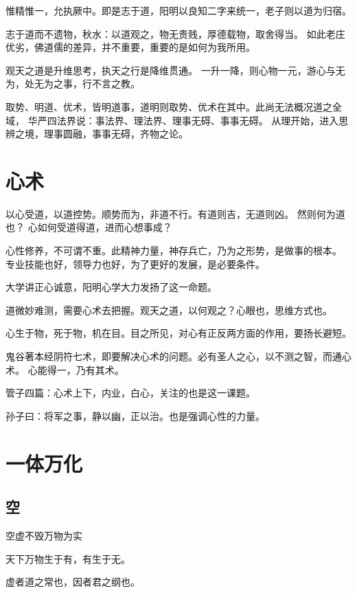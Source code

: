 惟精惟一，允执厥中。即是志于道，阳明以良知二字来统一，老子则以道为归宿。

志于道而不遗物，秋水：以道观之，物无贵贱，厚德载物，取舍得当。
如此老庄优劣，佛道儒的差异，并不重要，重要的是如何为我所用。

观天之道是升维思考，执天之行是降维贯通。
一升一降，则心物一元，游心与无为，处无为之事，行不言之教。

取势、明道、优术，皆明道事，道明则取势、优术在其中。此尚无法概况道之全域，
华严四法界说：事法界、理法界、理事无碍、事事无碍。
从理开始，进入思辨之境，理事圆融，事事无碍，齐物之论。

\section{心术}

以心受道，以道控势。顺势而为，非道不行。有道则吉，无道则凶。
然则何为道也？ 心如何受道得道，进而心想事成？

心性修养，不可谓不重。此精神力量，神存兵亡，乃为之形势，是做事的根本。
专业技能也好，领导力也好，为了更好的发展，是必要条件。

大学讲正心诚意，阳明心学大力发扬了这一命题。

道微妙难测，需要心术去把握。观天之道，以何观之？心眼也，思维方式也。

心生于物，死于物，机在目。目之所见，对心有正反两方面的作用，要扬长避短。

鬼谷著本经阴符七术，即要解决心术的问题。必有圣人之心，以不测之智，而通心术。
心能得一，乃有其术。

管子四篇：心术上下，内业，白心，关注的也是这一课题。

孙子曰：将军之事，静以幽，正以治。也是强调心性的力量。

\section{一体万化}

\subsection{空}

\begin{enumbox}
\item 空虚不毁万物为实
\item 天下万物生于有，有生于无。
\item 虚者道之常也，因者君之纲也。
\end{enumbox}

